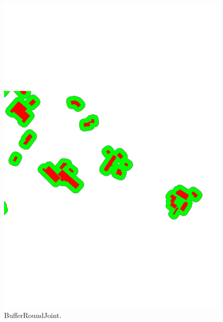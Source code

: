 \documentclass[graybox]{svmult}
\begin{document}
\begin{figure}[tb]
	\centering
	\includegraphics[width=\linewidth]{BufferRoundJoint}
	\caption{BufferRoundJoint.}
	\label{fig:BufferRoundJoint}
\end{figure}
\end{document}
